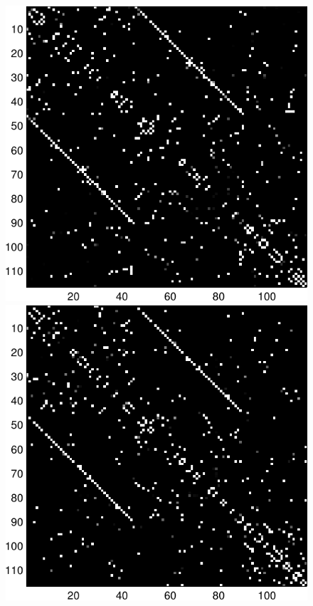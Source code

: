 \documentclass[a4paper, 10pt, english, onecolumn]{article}
\begin{document}
\begin{figure}[h!]
  \includegraphics[height=0.29\textheight]{images/new/struct_subj3-crop}
  \includegraphics[height=0.29\textheight]{images/new/struct_subj4-crop}

\end{figure}
\end{document}

